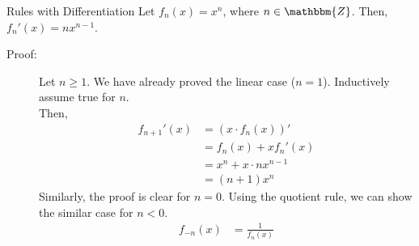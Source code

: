 \documentclass[10pt]{extarticle}
\newcommand{\Z}{\mathbbm{Z}}
\begin{document}
  \begin{problem}{Rules with Differentiation}
    Let $f_n(x) = x^n$, where $n\in \Z$. Then, $f_n'(x) = nx^{n-1}$.
    \begin{description}
      \item[Proof:] Let $n\geq 1$. We have already proved the linear case ($n=1$). Inductively assume true for $n$.\\

        Then, 
        \begin{align*}
          f_{n+1}'(x) &= (x \cdot f_n(x))'\\
                      &= f_n(x) + xf_n'(x)\\
                      &= x^n + x \cdot nx^{n-1}\\
                      &= (n+1)x^{n}
        \end{align*}
        Similarly, the proof is clear for $n=0$. Using the quotient rule, we can show the similar case for $n < 0$.
        \begin{align*}
          f_{-n}(x) &= \frac{1}{f_n(x)} \tag*{$n = 1,2,3,\dots$}
        \end{align*}
    \end{description}
  \end{problem}
\end{document}
